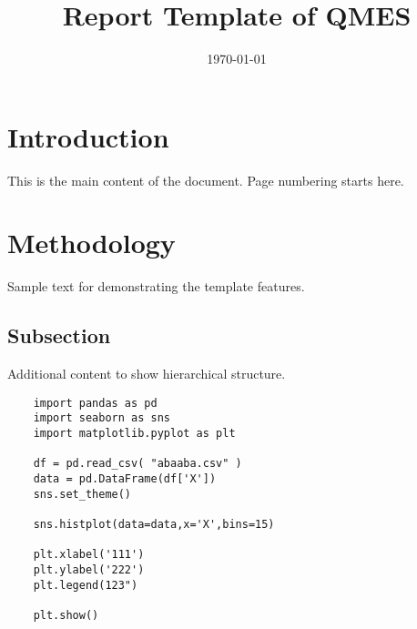 \documentclass{qmes-template}
\title{Report Template of QMES}
\date{\today}
\begin{document}
\maketitle
\tableofcontents

\section{Introduction}
This is the main content of the document. Page numbering starts here.

\section{Methodology}
Sample text for demonstrating the template features.

\subsection{Subsection}
Additional content to show hierarchical structure.

\begin{lstlisting}
    import pandas as pd
    import seaborn as sns
    import matplotlib.pyplot as plt
    
    df = pd.read_csv( "abaaba.csv" )
    data = pd.DataFrame(df['X'])
    sns.set_theme()
    
    sns.histplot(data=data,x='X',bins=15)
    
    plt.xlabel('111')
    plt.ylabel('222')
    plt.legend(123")
    
    plt.show()
\end{lstlisting}
\end{document}
